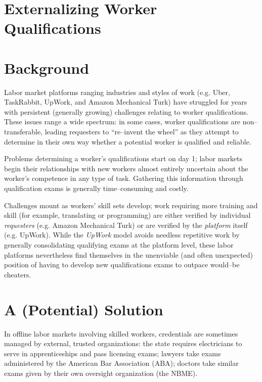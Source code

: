 \documentclass[11pt]{article}
\begin{document}
\section*{{\LARGE Externalizing Worker Qualifications}}
\section*{Background}
Labor market platforms ranging industries and styles of work
(e.g. Uber, TaskRabbit, UpWork, and Amazon Mechanical Turk)
have struggled for years with persistent
(generally growing)
challenges relating to worker qualifications.
These issues range a wide spectrum:
in some cases, worker qualifications are non--transferable,
leading requesters to ``re--invent the wheel'' as they attempt to determine
in their own way whether a potential worker is qualified and reliable.

Problems determining a worker's qualifications start on day 1;
labor markets begin their relationships with new workers
almost entirely uncertain about the worker's competence in any type of task.
Gathering this information through qualification exams is generally
time--consuming and costly.

Challenges mount as workers' skill sets develop;
work requiring more training and skill (for example, translating or programming)
are either verified by individual \textit{requesters} (e.g. Amazon Mechanical Turk)
or are verified by the \textit{platform} itself (e.g. UpWork).
While the \textit{UpWork} model avoids needless repetitive work by
generally consolidating qualifying exams at the platform level,
these labor platforms nevertheless find themselves in the unenviable
(and often unexpected) position of
having to develop new qualifications exams to outpace would--be cheaters.





\section*{A (Potential) Solution}
In offline labor markets involving skilled workers,
credentials are sometimes managed by
external, trusted organizations:
the state requires electricians
to serve in apprenticeships and
pass licensing exams;
lawyers take exams administered by the American Bar Association (ABA);
doctors take similar exams given by their own oversight organization (the NBME).
\end{document}
